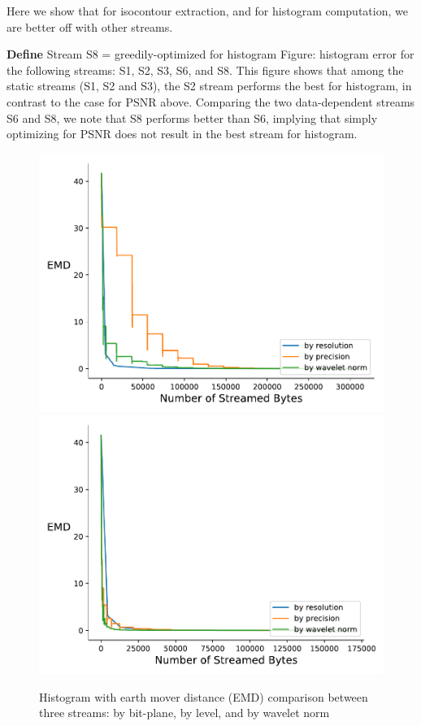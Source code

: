 Here we show that for isocontour extraction, and for histogram computation, we are better off with other streams.

\textbf{Define} Stream S8 = greedily-optimized for histogram
Figure: histogram error for the following streams: S1, S2, S3, S6, and S8. This figure shows that among the static streams (S1, S2 and S3), the S2 stream performs the best for histogram, in contrast to the case for PSNR above. Comparing the two data-dependent streams S6 and S8, we note that S8 performs better than S6, implying that simply optimizing for PSNR does not result in the best stream for histogram.

\begin{figure}[htb!]
	\centering
	{\includegraphics[width=0.4\linewidth]{img/independent/normalized/histogram-miranda-viscosity}}
	{\includegraphics[width=0.4\linewidth]{img/skip-zeros/histogram-miranda-viscosity}}
	\caption {Histogram with earth mover distance (EMD) comparison between three streams: by bit-plane, by level, and by wavelet norm}
	\label{fig:histogram_traditional_vs_by_norm_viscosity}
\end{figure}

